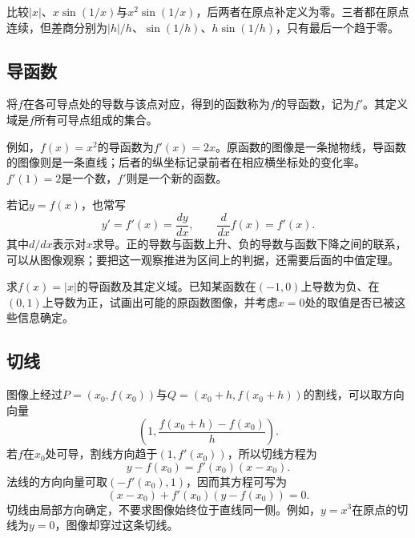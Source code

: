 比较\(|x|\)、\(x\sin(1/x)\)与\(x^2\sin(1/x)\)，后两者在原点补定义为零。三者都在原点连续，但差商分别为\(|h|/h\)、\(\sin(1/h)\)、\(h\sin(1/h)\)，只有最后一个趋于零。

\subsection{导函数}

\begin{definition}
将\(f\)在各可导点处的导数与该点对应，得到的函数称为\(f\)的{\heiti{}导函数}，记为\(f'\)。其定义域是\(f\)所有可导点组成的集合。
\end{definition}

例如，\(f(x)=x^2\)的导函数为\(f'(x)=2x\)。原函数的图像是一条抛物线，导函数的图像则是一条直线；后者的纵坐标记录前者在相应横坐标处的变化率。\(f'(1)=2\)是一个数，\(f'\)则是一个新的函数。

若记\(y=f(x)\)，也常写
\begin{equation*}
 y'=f'(x)=\frac{dy}{dx},\qquad \frac{d}{dx}f(x)=f'(x).
\end{equation*}
其中\(d/dx\)表示对\(x\)求导。正的导数与函数上升、负的导数与函数下降之间的联系，可以从图像观察；要把这一观察推进为区间上的判据，还需要后面的中值定理。

\begin{example}
求\(f(x)=|x|\)的导函数及其定义域。已知某函数在\((-1,0)\)上导数为负、在\((0,1)\)上导数为正，试画出可能的原函数图像，并考虑\(x=0\)处的取值是否已被这些信息确定。
\end{example}

\subsection{切线}

图像上经过\(P=(x_0,f(x_0))\)与\(Q=(x_0+h,f(x_0+h))\)的割线，可以取方向向量
\begin{equation*}
 \left(1,\frac{f(x_0+h)-f(x_0)}h\right).
\end{equation*}
若\(f\)在\(x_0\)处可导，割线方向趋于\((1,f'(x_0))\)，所以切线方程为
\begin{equation}\label{eq:calculus-tangent}
 y-f(x_0)=f'(x_0)(x-x_0).
\end{equation}
法线的方向向量可取\((-f'(x_0),1)\)，因而其方程可写为
\begin{equation*}
 (x-x_0)+f'(x_0)(y-f(x_0))=0.
\end{equation*}
切线由局部方向确定，不要求图像始终位于直线同一侧。例如，\(y=x^3\)在原点的切线为\(y=0\)，图像却穿过这条切线。

